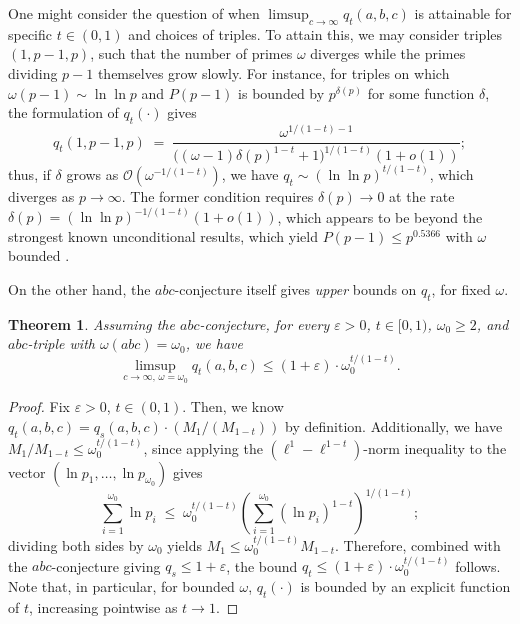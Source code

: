 \documentclass[11pt,letterpaper]{amsart}
\newtheorem{theorem}{Theorem}[section]
\newcommand{\eps}{\varepsilon}
\def\ra{\rightarrow}
\def\eps{\varepsilon}
\begin{document}
One might consider the question of when $\limsup_{c \ra \infty} q_t(a, b, c)$ is attainable for specific $t \in (0,1)$ and choices of triples. To attain this, we may consider triples $(1, p - 1, p)$, such that the number of primes $\omega$ diverges while the primes dividing $p-1$ themselves grow slowly. For instance, for triples on which $\omega(p-1)\sim\ln\ln p$ and $P(p-1)$ is bounded by $p^{\delta(p)}$ for some function $\delta$, the formulation of $q_t(\cdot)$ gives
\begin{equation*}
q_t(1,p-1,p) \;=\; \frac{\omega^{1/(1-t)-1}}{\bigl((\omega-1)\delta(p)^{1-t}+1\bigr)^{1/(1-t)} (1+o(1))};
\end{equation*}
thus, if $\delta$ grows as $\mathcal{O}(\omega^{-1/(1-t)})$, we have $q_t\sim(\ln\ln p)^{t/(1-t)}$, which diverges as $p \ra \infty$. The former condition requires $\delta(p) \ra 0$ at the rate 
$\delta(p)=(\ln\ln p)^{-1/(1-t)}(1+o(1))$, which appears to be beyond the strongest known unconditional results, which yield $P(p-1) \leq p^{0.5366}$ with $\omega$ bounded \cite{baker2014}.

On the other hand, the $abc$-conjecture itself gives \textit{upper} bounds on $q_t$, for fixed $\omega$.
\begin{theorem}\label{T_qt_UB}
Assuming the $abc$-conjecture, for every $\eps>0$, $t\in[0,1)$, $\omega_0\ge 2$, and $abc$-triple with $\omega(abc)=\omega_0$, we have
\[
\limsup_{c\to\infty,\,\omega=\omega_0} q_t(a,b,c) \leq (1+\eps) \cdot \omega_0^{t/(1-t)}.
\]
\end{theorem}
\begin{proof}
Fix $\eps > 0$, $t \in (0,1)$. Then, we know $q_t(a, b, c) = q_s(a, b, c) \cdot (M_1/(M_{1 - t}))$ by definition. Additionally, we have $M_1/M_{1-t} \le \omega_0^{t/(1-t)}$, 
since applying the $(\ell^1-\ell^{1 - t})$-norm inequality to the vector 
$(\ln p_1, \ldots, \ln p_{\omega_0})$ gives
\[
    \sum_{i=1}^{\omega_0} \ln p_i \;\le\; \omega_0^{t/(1-t)} 
    \left(\sum_{i=1}^{\omega_0}(\ln p_i)^{1-t}\right)^{1/(1-t)};
\]
dividing both sides by $\omega_0$ yields $M_1 \le \omega_0^{t/(1-t)} M_{1-t}$. 
Therefore, combined with the $abc$-conjecture giving $q_s \le 1 + \eps$, the bound 
$q_t \le (1+\eps)\cdot\omega_0^{t/(1-t)}$ follows. Note that, in particular, for bounded $\omega$, $q_t(\cdot)$ is bounded by an explicit function of $t$, increasing pointwise as $t \ra 1$.
\end{proof}
\end{document}
